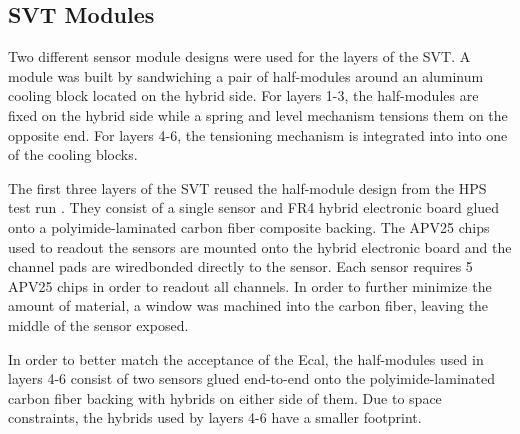 
\subsection{SVT Modules}

Two different sensor module designs were used for the layers of the SVT.
A module was built by sandwiching a pair of half-modules around an aluminum 
cooling block located on the hybrid side. For layers 1-3, the half-modules are 
fixed on the hybrid side while a spring and level mechanism tensions them on
the opposite end.  For layers 4-6, the tensioning mechanism is integrated into
into one of the cooling blocks.

The first three layers of the SVT reused the half-module design from the HPS 
test run \cite{Battaglieri:2014hga}. They consist of a single sensor
and FR4 hybrid electronic board glued onto a polyimide-laminated carbon fiber
composite backing.  The APV25 chips used to readout the sensors are mounted 
onto the hybrid electronic board and the channel pads are wiredbonded directly
to the sensor. Each sensor requires 5 APV25 chips in order to readout all channels.
In order to further minimize the amount of material, a window 
was machined into the carbon fiber, leaving the middle of the sensor exposed.

In order to better match the acceptance of the Ecal, 
the half-modules used in layers 4-6 consist of two sensors glued end-to-end onto
the polyimide-laminated carbon fiber backing with hybrids on either side of them.
Due to space constraints, the hybrids used by layers 4-6 have a smaller footprint.


